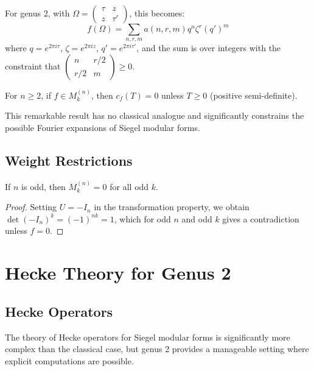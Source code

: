 For genus 2, with $\Omega = \begin{pmatrix} \tau & z \\ z & \tau' \end{pmatrix}$, this becomes:
\begin{equation}
f(\Omega) = \sum_{n,r,m} a(n,r,m) q^n \zeta^r (q')^m
\label{eq:genus2_fourier}
\end{equation}
where $q = e^{2\pi i \tau}$, $\zeta = e^{2\pi i z}$, $q' = e^{2\pi i \tau'}$, and the sum is over integers with the constraint that $\begin{pmatrix} n & r/2 \\ r/2 & m \end{pmatrix} \geq 0$.

\begin{theorem}
\label{thm:koecher}
For $n \geq 2$, if $f \in M_k^{(n)}$, then $c_f(T) = 0$ unless $T \geq 0$ (positive semi-definite).
\end{theorem}

This remarkable result has no classical analogue and significantly constrains the possible Fourier expansions of Siegel modular forms.

\subsection{Weight Restrictions}

\begin{theorem}
\label{thm:weight_parity}
If $n$ is odd, then $M_k^{(n)} = 0$ for all odd $k$.
\end{theorem}

\begin{proof}
Setting $U = -I_n$ in the transformation property, we obtain $\det(-I_n)^k = (-1)^{nk} = 1$, which for odd $n$ and odd $k$ gives a contradiction unless $f = 0$.
\end{proof}

\section{Hecke Theory for Genus 2}
\label{sec:hecke_theory}

\subsection{Hecke Operators}

The theory of Hecke operators for Siegel modular forms is significantly more complex than the classical case, but genus 2 provides a manageable setting where explicit computations are possible.

